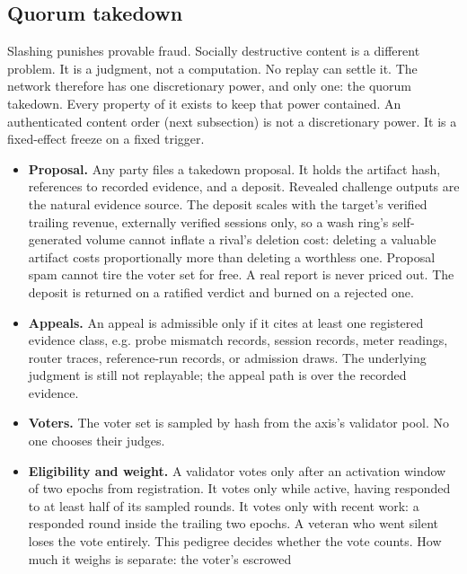 \documentclass[11pt]{article}
\begin{document}
\subsection{Quorum takedown}

Slashing punishes provable fraud. Socially destructive content is
a different problem. It is a judgment, not a computation. No
replay can settle it. The network therefore has one discretionary
power, and only one: the quorum takedown. Every property of it
exists to keep that power contained. An authenticated content
order (next subsection) is not a discretionary power. It is a
fixed-effect freeze on a fixed trigger.

\begin{itemize}
    \item \textbf{Proposal.} Any party files a takedown proposal. It
          holds the artifact hash, references to recorded evidence, and a
          deposit. Revealed challenge outputs are the natural evidence
          source. The deposit scales with the target's verified trailing revenue,
          externally verified sessions only, so a wash ring's
          self-generated volume cannot inflate a rival's deletion cost:
          deleting a valuable artifact costs proportionally more
          than deleting a worthless one. Proposal spam cannot tire the
          voter set for free. A real report is never priced out. The
          deposit is returned on a ratified verdict and burned on a
          rejected one.
    \item \textbf{Appeals.} An appeal is admissible only if it
          cites at least one registered evidence class, e.g. probe mismatch
          records, session records, meter readings, router traces,
          reference-run records, or admission draws. The underlying
          judgment is still not replayable; the appeal path is over the
          recorded evidence.
    \item \textbf{Voters.} The voter set is sampled by hash from the
          axis's validator pool. No one chooses their judges.
    \item \textbf{Eligibility and weight.} A validator votes only
          after an activation window of two epochs from registration. It
          votes only while active, having responded to at least half of its
          sampled rounds. It votes only with recent work: a responded
          round inside the trailing two epochs. A veteran who went silent
          loses the vote entirely. This pedigree decides whether the vote
          counts. How much it weighs is separate: the voter's escrowed

\end{itemize}
\end{document}
